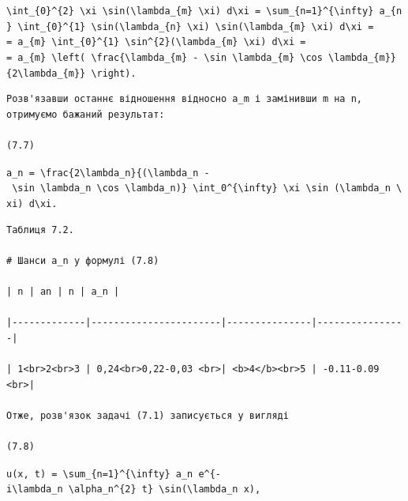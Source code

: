 \documentclass[
  ukrainian,
]{article}
\begin{document}
\texttt{\textbackslash{}int\_\{0\}\^{}\{2\}\ \textbackslash{}xi\ \textbackslash{}sin(\textbackslash{}lambda\_\{m\}\ \textbackslash{}xi)\ d\textbackslash{}xi\ =\ \textbackslash{}sum\_\{n=1\}\^{}\{\textbackslash{}infty\}\ a\_\{n\}\ \textbackslash{}int\_\{0\}\^{}\{1\}\ \textbackslash{}sin(\textbackslash{}lambda\_\{n\}\ \textbackslash{}xi)\ \textbackslash{}sin(\textbackslash{}lambda\_\{m\}\ \textbackslash{}xi)\ d\textbackslash{}xi\ =}
\texttt{=\ a\_\{m\}\ \textbackslash{}int\_\{0\}\^{}\{1\}\ \textbackslash{}sin\^{}\{2\}(\textbackslash{}lambda\_\{m\}\ \textbackslash{}xi)\ d\textbackslash{}xi\ =}
\texttt{=\ a\_\{m\}\ \textbackslash{}left(\ \textbackslash{}frac\{\textbackslash{}lambda\_\{m\}\ -\ \textbackslash{}sin\ \textbackslash{}lambda\_\{m\}\ \textbackslash{}cos\ \textbackslash{}lambda\_\{m\}\}\{2\textbackslash{}lambda\_\{m\}\}\ \textbackslash{}right).}

\begin{verbatim}
Розв'язавши останнє відношення відносно a_m і замінивши m на n, отримуємо бажаний результат:

(7.7)
\end{verbatim}

\texttt{a\_n\ =\ \textbackslash{}frac\{2\textbackslash{}lambda\_n\}\{(\textbackslash{}lambda\_n\ -\ \textbackslash{}sin\ \textbackslash{}lambda\_n\ \textbackslash{}cos\ \textbackslash{}lambda\_n)\}\ \textbackslash{}int\_0\^{}\{\textbackslash{}infty\}\ \textbackslash{}xi\ \textbackslash{}sin\ (\textbackslash{}lambda\_n\ \textbackslash{}xi)\ d\textbackslash{}xi.}

\begin{verbatim}
Таблиця 7.2.

# Шанси a_n у формулі (7.8)

| n | an | n | a_n |

|-------------|-----------------------|---------------|----------------|

| 1<br>2<br>3 | 0,24<br>0,22-0,03 <br>| <b>4</b><br>5 | -0.11-0.09 <br>|

Отже, розв'язок задачі (7.1) записується у вигляді

(7.8)
\end{verbatim}

\texttt{u(x,\ t)\ =\ \textbackslash{}sum\_\{n=1\}\^{}\{\textbackslash{}infty\}\ a\_n\ e\^{}\{-i\textbackslash{}lambda\_n\ \textbackslash{}alpha\_n\^{}\{2\}\ t\}\ \textbackslash{}sin(\textbackslash{}lambda\_n\ x),}
\end{document}

